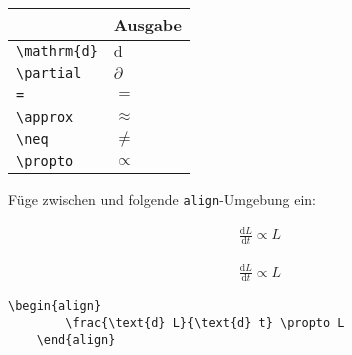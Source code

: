 \documentclass["WS\space 16-17\space -\space LaTeX-Kurs\space -\space Praesentation\space -\space 1.tex"]{subfiles}
\begin{document}
\begin{frame}[fragile]
	\begin{center}
		\begin{tabular}{ll}
			\toprule
			\color{math-cmd}{Mathe}\color{black}{-Befehl}							&	Ausgabe					\\ \midrule
			\lstinline|\mathrm{d}|		&	$\mathrm{d}$		\\
			\lstinline|\partial|		&	$\partial$		
			\\
			\lstinline|=|		&	$=$		
      \\
			\lstinline|\approx|		&	$\approx$		
			\\
			\lstinline|\neq|					&	$\neq$		\\
      \lstinline|\propto|					&	$\propto$		\\
			\bottomrule
		\end{tabular}
	\end{center}
	\pause\btVFill
	\Aufgabee
	Füge zwischen  und  folgende \lstinline[basicstyle=\normalfont\normalsize]|align|-Umgebung ein:
	\begin{outputbox}
	    \begin{align}
	        \frac{\text{d} L}{\text{d} t} \propto L 
	    \end{align}	
    \end{outputbox}
	\vspace{0.3cm}
\end{frame}
\begin{frame}[fragile]
	\Losung
	\begin{outputbox}
    \begin{align}
      \frac{\text{d} L}{\text{d} t} \propto L 
    \end{align}
	\end{outputbox}

	\Code
	\begin{lstlisting}[gobble=4]
    \begin{align}
        \frac{\text{d} L}{\text{d} t} \propto L 
    \end{align}
	\end{lstlisting}
\end{frame}
\end{document}
